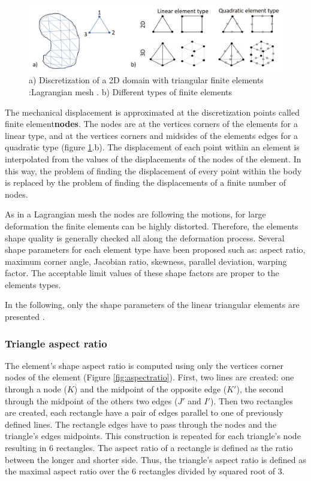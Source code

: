 \begin{figure}[!h]
\centering
\includegraphics[width=1\textwidth,keepaspectratio]{figures/discretization.jpg} 
\caption{a) Discretization of  a 2D domain with triangular finite elements :Lagrangian mesh . b) Different types of finite elements}
\label{discretization}
\end{figure}

 The mechanical displacement is approximated at the discretization points called finite element\textbf{nodes}. The nodes are at the vertices corners of the elements for a linear type, and at the vertices corners and midsides of the elements edges for a quadratic type (figure \ref{discretization}.b). The displacement of each point within an element is interpolated from the values of the displacements of the nodes of the element. In this way, the problem of finding the displacement of every point within the body is replaced by the problem of finding the displacements of a finite number of nodes.
 
 As in a Lagrangian mesh the nodes are following the motions, for large deformation the finite elements can be highly distorted. Therefore, the elements shape quality is generally checked all along the deformation process. Several shape parameters for each element type have been proposed such as: aspect ratio, maximum corner angle, Jacobian ratio, skewness, parallel deviation, warping factor. The acceptable limit values of these shape factors are proper to the elements types. 
 
In the following, only the shape parameters of the linear triangular elements are presented \citep{ansys_theory_2017}.  
 \subsubsection*{Triangle aspect ratio }
 The element's shape aspect ratio is computed using only the vertices corner nodes of the element (Figure \ref{fig:aspectratio}). First, two lines are created: one through a node ($K$) and the midpoint of the opposite edge ($ K'$), the second through the midpoint of the others two edges ($J'$ and $ I'$). Then two rectangles are created, each rectangle have a pair of edges parallel to one of previously defined lines. The rectangle edges have to pass through the nodes and the triangle's edges midpoints. This construction is repeated for each triangle's node resulting in 6 rectangles. The aspect ratio of a rectangle is defined as the ratio between the longer and shorter side. Thus, the triangle's aspect ratio is defined as the maximal aspect ratio over the 6 rectangles divided by squared root of 3. 
 
